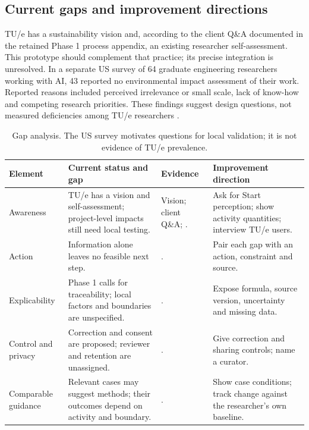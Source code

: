 \subsection{Current gaps and improvement directions}
TU/e has a sustainability vision and, according to the client Q\&A documented in the retained Phase 1 process appendix, an existing researcher self-assessment. This prototype should complement that practice; its precise integration is unresolved. In a separate US survey of 64 graduate engineering researchers working with AI, 43 reported no environmental impact assessment of their work. Reported reasons included perceived irrelevance or small scale, lack of know-how and competing research priorities. These findings suggest design questions, not measured deficiencies among TU/e researchers \citep{shiekh2026graduate}.
\begin{table}[H]
\centering\footnotesize
\begin{tabularx}{\textwidth}{@{}>{\raggedright\arraybackslash}p{}>{\raggedright\arraybackslash}p{}>{\raggedright\arraybackslash}p{}>{\raggedright\arraybackslash}X@{}}
\toprule
Element & Current status and gap & Evidence & Improvement direction \\
\midrule
Awareness & TU/e has a vision and self-assessment; project-level impacts still need local testing. & Vision; client Q\&A; \citep{shiekh2026graduate}. & Ask for Start perception; show activity quantities; interview TU/e users. \\
Action & Information alone leaves no feasible next step. & \citep{shiekh2026graduate,abrahamse2005review}. & Pair each gap with an action, constraint and source. \\
Explicability & Phase 1 calls for traceability; local factors and boundaries are unspecified. & \citep{friedman2019shaping}. & Expose formula, source version, uncertainty and missing data. \\
Control and privacy & Correction and consent are proposed; reviewer and retention are unassigned. & \citep{santoni2018control,nissenbaum2004privacy}. & Give correction and sharing controls; name a curator. \\
Comparable guidance & Relevant cases may suggest methods; their outcomes depend on activity and boundary. & \citep{oecd2008composite}. & Show case conditions; track change against the researcher's own baseline. \\
\bottomrule
\end{tabularx}
\caption{Gap analysis. The US survey motivates questions for local validation; it is not evidence of TU/e prevalence.}
\label{tab:phase2-gaps}
\end{table}

